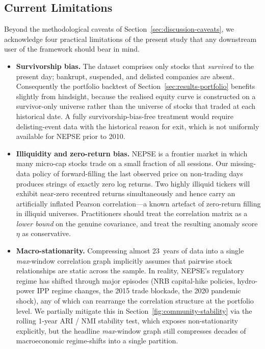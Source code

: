 \subsection{Current Limitations}
\label{sec:discussion-limitations}

Beyond the methodological caveats of Section~\ref{sec:discussion-caveats},
we acknowledge four practical limitations of the present study that any
downstream user of the framework should bear in mind.
\begin{itemize}
  \item \textbf{Survivorship bias.}  The dataset comprises only stocks
  that \emph{survived} to the present day; bankrupt, suspended, and
  delisted companies are absent.  Consequently the portfolio
  backtest of Section~\ref{sec:results-portfolio} benefits slightly
  from hindsight, because the realised equity curve is constructed on
  a survivor-only universe rather than the universe of stocks that
  traded at each historical date.  A fully survivorship-bias-free
  treatment would require delisting-event data with the historical
  reason for exit, which is not uniformly available for NEPSE prior
  to 2010.

  \item \textbf{Illiquidity and zero-return bias.}  NEPSE is a
  frontier market in which many micro-cap stocks trade on a small
  fraction of all sessions.  Our missing-data policy of
  forward-filling the last observed price on non-trading days produces
  strings of exactly zero log returns.  Two highly illiquid tickers
  will exhibit near-zero recentred returns simultaneously and hence
  carry an artificially inflated Pearson correlation---a known
  artefact of zero-return filling in illiquid universes.  Practitioners
  should treat the correlation matrix as a \emph{lower bound} on the
  genuine covariance, and treat the resulting anomaly score $\eta$ as
  conservative.

  \item \textbf{Macro-stationarity.}  Compressing almost 23~years of
  data into a single \emph{max}-window correlation graph implicitly
  assumes that pairwise stock relationships are static across the
  sample.  In reality, NEPSE's regulatory regime has shifted through
  major episodes (NRB capital-hike policies, hydro-power IPP
  regime changes, the 2015 trade blockade, the 2020 pandemic shock),
  any of which can rearrange the correlation structure at the
  portfolio level.  We partially mitigate this in
  Section~\ref{fig:community-stability} via the rolling 1-year ARI
  / NMI stability test, which exposes non-stationarity explicitly,
  but the headline \emph{max}-window graph still compresses decades of
  macroeconomic regime-shifts into a single partition.


\end{itemize}
